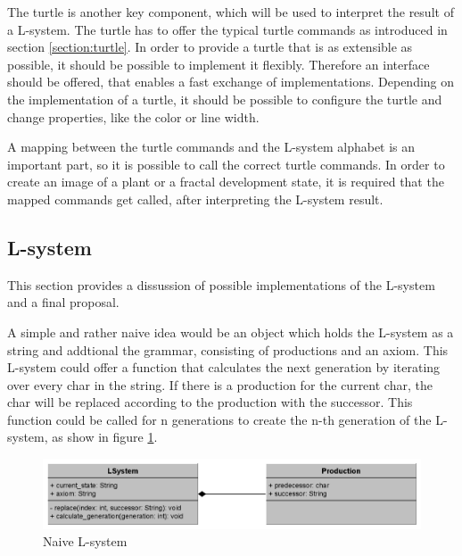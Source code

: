 \documentclass[english]{cpp-hmwk}
\begin{document}
\medskip

\noindent The turtle is another key component, which will be used to interpret the result of a L-system. The turtle has to offer the typical turtle commands as introduced in section \ref{section:turtle}. In order to provide a turtle that is as extensible as possible, it should be possible to implement it flexibly. Therefore an interface should be offered, that enables a fast exchange of implementations. Depending on the implementation of a turtle, it should be possible to configure the turtle and change properties, like the color or line width.

\medskip
\noindent A mapping between the turtle commands and the L-system alphabet is an important part, so it is possible to call the correct turtle commands. In order to create an image of a plant or a fractal development state, it is required that the mapped commands get called, after interpreting the L-system result.


\subsection{L-system}
\label{section:lsystem_discussion}
This section provides a dissussion of possible implementations of the L-system and a final proposal.

\medskip

\noindent A simple and rather naive idea would be an object which holds the L-system as a string and addtional the grammar, consisting of productions and an axiom. This L-system could offer a function that calculates the next generation by iterating over every char in the string. If there is a production for the current char, the char will be replaced according to the production with the successor. This function could be called for n generations to create the n-th generation of the L-system, as show in figure \ref{figure:naive_lsystem}.

\begin{figure}[h!]
	\centering
	\includegraphics[width=1\columnwidth]{../graphs/LSystem/naive/class_diagram_l_system_naive.png}
	\caption{Naive L-system}
	\label{figure:naive_lsystem}
\end{figure}
\end{document}
